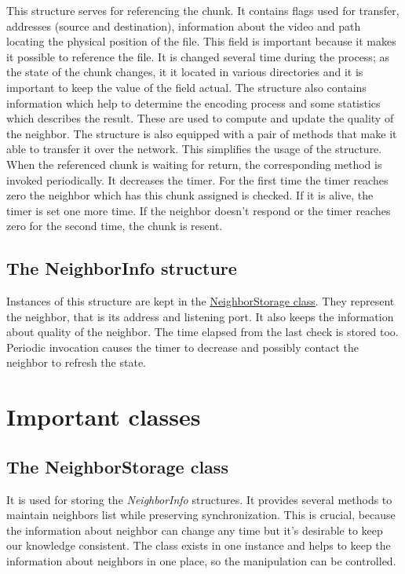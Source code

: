 This structure serves for referencing the chunk. It contains flags used
for transfer, addresses (source and destination), information about the
video and path locating the physical position of the file. This field is
important because it makes it possible to reference the file. It is
changed several time during the process; as the state of the chunk
changes, it it located in various directories and it is important to
keep the value of the field actual. The structure also contains
information which help to determine the encoding process and some
statistics which describes the result. These are used to compute and
update the quality of the neighbor. The structure is also equipped with
a pair of methods that make it able to transfer it over the network.
This simplifies the usage of the structure. When the referenced chunk is
waiting for return, the corresponding method is invoked periodically. It
decreases the timer. For the first time the timer reaches zero the
neighbor which has this chunk assigned is checked. If it is alive, the
timer is set one more time. If the neighbor doesn't respond or the timer
reaches zero for the second time, the chunk is resent.

\subsection{The NeighborInfo
structure}\label{the-neighborinfo-structure}

Instances of this structure are kept in the
\hyperref[neighborstorage]{NeighborStorage class}. They represent the
neighbor, that is its address and listening port. It also keeps the
information about quality of the neighbor. The time elapsed from the
last check is stored too. Periodic invocation causes the timer to
decrease and possibly contact the neighbor to refresh the state.

\section{Important classes}\label{important-classes}

\subsection{The NeighborStorage class}\label{the-neighborstorage-class}

It is used for storing the \textit{NeighborInfo} structures. It provides
several methods to maintain neighbors list while preserving
synchronization. This is crucial, because the information about neighbor
can change any time but it's desirable to keep our knowledge consistent.
The class exists in one instance and helps to keep the information about
neighbors in one place, so the manipulation can be controlled.

